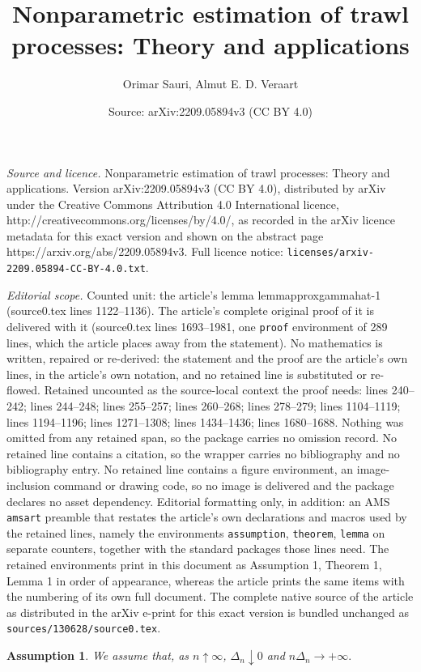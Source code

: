\documentclass[10pt,a4paper]{amsart}
\title{Nonparametric estimation of trawl processes: Theory and applications}
\author{Orimar Sauri, Almut E. D. Veraart}
\date{Source: arXiv:2209.05894v3 (CC BY 4.0)}
\newtheorem{assumption}{Assumption}
\begin{document}
\maketitle

\noindent\emph{Source and licence.} Nonparametric estimation of trawl processes: Theory and applications. Version arXiv:2209.05894v3 (CC BY 4.0), distributed by arXiv under the Creative Commons Attribution 4.0 International licence, http://creativecommons.org/licenses/by/4.0/, as recorded in the arXiv licence metadata for this exact version and shown on the abstract page https://arxiv.org/abs/2209.05894v3. Full licence notice: \texttt{licenses/arxiv-2209.05894-CC-BY-4.0.txt}.\par\smallskip

\noindent\textit{Editorial scope.} Counted unit: the article's lemma lemmapproxgammahat-1 (source0.tex lines 1122--1136). The article's complete original proof of it is delivered with it (source0.tex lines 1693--1981, one \texttt{proof} environment of 289 lines, which the article places away from the statement). No mathematics is written, repaired or re-derived: the statement and the proof are the article's own lines, in the article's own notation, and no retained line is substituted or re-flowed.  Retained uncounted as the source-local context the proof needs: lines 240--242; lines 244--248; lines 255--257; lines 260--268; lines 278--279; lines 1104--1119; lines 1194--1196; lines 1271--1308; lines 1434--1436; lines 1680--1688.  Nothing was omitted from any retained span, so the package carries no omission record.  No retained line contains a citation, so the wrapper carries no bibliography and no bibliography entry.  No retained line contains a figure environment, an image-inclusion command or drawing code, so no image is delivered and the package declares no asset dependency.  Editorial formatting only, in addition: an AMS \texttt{amsart} preamble that restates the article's own declarations and macros used by the retained lines, namely the environments \texttt{assumption}, \texttt{theorem}, \texttt{lemma} on separate counters, together with the standard packages those lines need.  The retained environments print in this document as Assumption 1, Theorem 1, Lemma 1 in order of appearance, whereas the article prints the same items with the numbering of its own full document.  The complete native source of the article as distributed in the arXiv e-print for this exact version is bundled unchanged as \texttt{sources/130628/source0.tex}.
\begin{assumption}\label{as:basicsamplingscheme} We assume that, as $n\uparrow\infty$,
	$\Delta_{n}\downarrow0$ and $n\Delta_{n}\rightarrow+\infty.$ 
\end{assumption}
\end{document}
